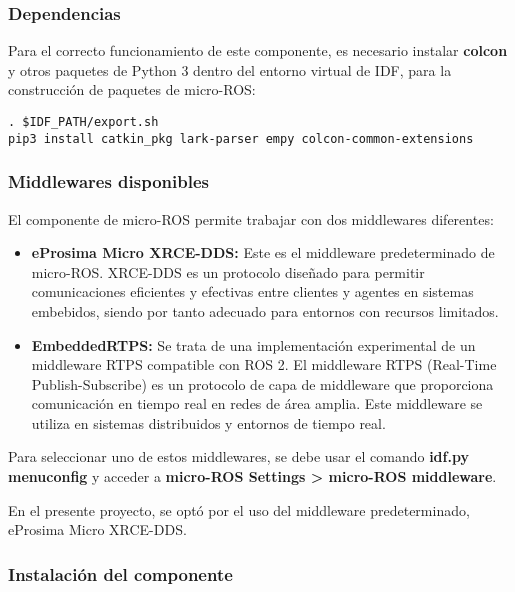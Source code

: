 \subsubsection{Dependencias}

Para el correcto funcionamiento de este componente, es necesario instalar \textbf{colcon} y otros paquetes de Python 3 dentro del entorno virtual de IDF, para la construcción de paquetes de micro-ROS:

\begin{verbatim}
. $IDF_PATH/export.sh
pip3 install catkin_pkg lark-parser empy colcon-common-extensions
\end{verbatim}

\subsubsection{Middlewares disponibles}

El componente de micro-ROS permite trabajar con dos middlewares diferentes:

\begin{itemize}
\item \textbf{eProsima Micro XRCE-DDS:} Este es el middleware predeterminado de micro-ROS. XRCE-DDS es un protocolo diseñado para permitir comunicaciones eficientes y efectivas entre clientes y agentes en sistemas embebidos, siendo por tanto adecuado para entornos con recursos limitados.

\item \textbf{EmbeddedRTPS:} Se trata de una implementación experimental de un middleware RTPS compatible con ROS 2. El middleware RTPS (Real-Time Publish-Subscribe) es un protocolo de capa de middleware que proporciona comunicación en tiempo real en redes de área amplia. Este middleware se utiliza en sistemas distribuidos y entornos de tiempo real.
\end{itemize}

Para seleccionar uno de estos middlewares, se debe usar el comando \textbf{idf.py menuconfig} y acceder a \textbf{micro-ROS Settings > micro-ROS middleware}.



En el presente proyecto, se optó por el uso del middleware predeterminado, eProsima Micro XRCE-DDS.

\subsubsection{Instalación del componente}


